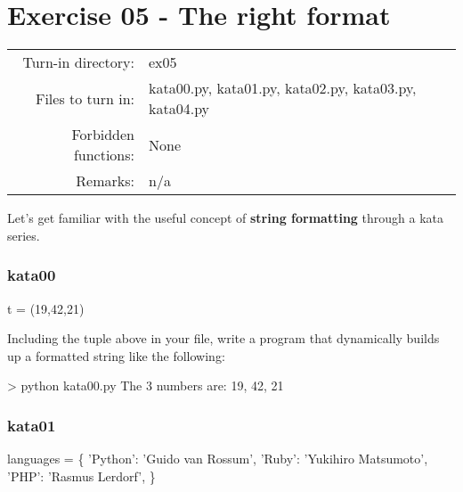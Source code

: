 \documentclass[]{article}
\newenvironment{Shaded}{\begin{snugshade}}{\end{snugshade}}
\newcommand{\NormalTok}[1]{\textcolor[rgb]{0.81,0.81,0.76}{#1}}
\begin{document}
\clearpage

\hypertarget{exercise-05---the-right-format-1}{%
\section{Exercise 05 - The right
format}\label{exercise-05---the-right-format-1}}

\begin{longtable}[]{@{}rl@{}}
\toprule
\endhead
Turn-in directory: & ex05\tabularnewline
Files to turn in: & kata00.py, kata01.py, kata02.py, kata03.py,
kata04.py\tabularnewline
Forbidden functions: & None\tabularnewline
Remarks: & n/a\tabularnewline
\bottomrule
\end{longtable}

Let's get familiar with the useful concept of \textbf{string formatting}
through a kata series.

\hypertarget{kata00}{%
\subsubsection{kata00}\label{kata00}}

\begin{Shaded}
\begin{Highlighting}[]
\NormalTok{t = (19,42,21)}
\end{Highlighting}
\end{Shaded}

Including the tuple above in your file, write a program that dynamically
builds up a formatted string like the following:

\begin{Shaded}
\begin{Highlighting}[]
\NormalTok{> python kata00.py}
\NormalTok{The 3 numbers are: 19, 42, 21}
\end{Highlighting}
\end{Shaded}

\hypertarget{kata01}{%
\subsubsection{kata01}\label{kata01}}

\begin{Shaded}
\begin{Highlighting}[]
\NormalTok{languages = \{}
\NormalTok{    'Python': 'Guido van Rossum',}
\NormalTok{    'Ruby': 'Yukihiro Matsumoto',}
\NormalTok{    'PHP': 'Rasmus Lerdorf',}
\NormalTok{    \}}
\end{Highlighting}
\end{Shaded}
\end{document}
